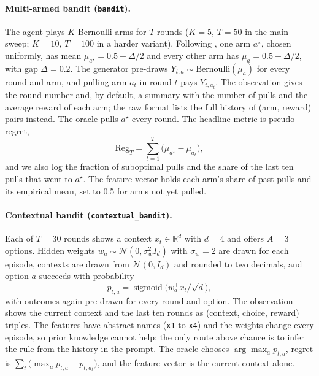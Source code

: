 \paragraph{Multi-armed bandit (\texttt{bandit}).}
The agent plays $K$ Bernoulli arms for $T$ rounds ($K=5$, $T=50$ in the main sweep; $K=10$, $T=100$ in a harder variant). Following \citet{krishnamurthy2024explore}, one arm $a^\star$, chosen uniformly, has mean $\mu_{a^\star}=0.5+\Delta/2$ and every other arm has $\mu_a=0.5-\Delta/2$, with gap $\Delta=0.2$. The generator pre-draws $Y_{t,a}\sim\mathrm{Bernoulli}(\mu_a)$ for every round and arm, and pulling arm $a_t$ in round $t$ pays $Y_{t,a_t}$. The observation gives the round number and, by default, a summary with the number of pulls and the average reward of each arm; the raw format lists the full history of (arm, reward) pairs instead. The oracle pulls $a^\star$ every round. The headline metric is pseudo-regret,
\begin{equation}
\mathrm{Reg}_T = \sum_{t=1}^{T}\bigl(\mu_{a^\star} - \mu_{a_t}\bigr),
\end{equation}
and we also log the fraction of suboptimal pulls and the share of the last ten pulls that went to $a^\star$. The feature vector holds each arm's share of past pulls and its empirical mean, set to 0.5 for arms not yet pulled.

\paragraph{Contextual bandit (\texttt{contextual\_bandit}).}
Each of $T=30$ rounds shows a context $x_t\in\mathbb{R}^d$ with $d=4$ and offers $A=3$ options. Hidden weights $w_a\sim\mathcal{N}(0,\sigma_w^2 I_d)$ with $\sigma_w=2$ are drawn for each episode, contexts are drawn from $\mathcal{N}(0,I_d)$ and rounded to two decimals, and option $a$ succeeds with probability
\begin{equation}
p_{t,a} = \operatorname{sigmoid}\bigl(w_a^\top x_t / \sqrt{d}\bigr),
\end{equation}
with outcomes again pre-drawn for every round and option. The observation shows the current context and the last ten rounds as (context, choice, reward) triples. The features have abstract names (\texttt{x1} to \texttt{x4}) and the weights change every episode, so prior knowledge cannot help: the only route above chance is to infer the rule from the history in the prompt. The oracle chooses $\arg\max_a p_{t,a}$, regret is $\sum_t\bigl(\max_a p_{t,a}-p_{t,a_t}\bigr)$, and the feature vector is the current context alone.

